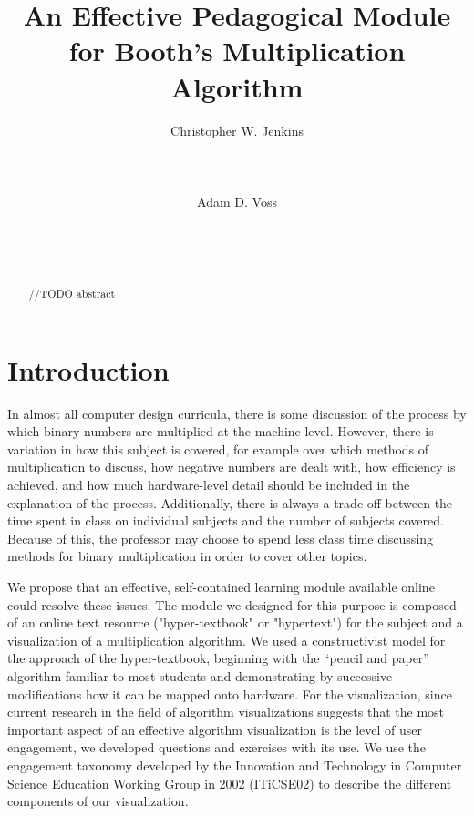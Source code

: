 \documentclass{acm_proc_article-sp}
\begin{document}
\title{An Effective Pedagogical Module for Booth's Multiplication Algorithm}

\author{
    \alignauthor
    Christopher W.
Jenkins\\
       \\
       \\
       \\
    \alignauthor
    Adam D.
Voss\\
       \\
       \\
       \\
}

\maketitle

\begin{abstract}
//TODO abstract
\end{abstract}

\section{Introduction}
In almost all computer design curricula, there is some discussion of the process by which binary numbers are multiplied at the machine level.
However, there is variation in how this subject is covered, for example over which methods of multiplication to discuss, how negative numbers are dealt with, how efficiency is achieved, and how much hardware-level detail should be included in the explanation of the process.
Additionally, there is always a trade-off between the time spent in class on individual subjects and the number of subjects covered.
Because of this, the professor may choose to spend less class time discussing methods for binary multiplication in order to cover other topics.

We propose that an effective, self-contained learning module available online could resolve these issues.
The module we designed for this purpose is composed of an online text resource ("hyper-textbook" or "hypertext") for the subject and a visualization of a multiplication algorithm.
We used a constructivist model for the approach of the hyper-textbook, beginning with the ``pencil and paper'' algorithm familiar to most students and demonstrating by successive modifications how it can be mapped onto hardware.
For the visualization, since current research in the field of algorithm visualizations suggests that the most important aspect of an effective algorithm visualization is the level of user engagement\cite{tnaps:visengage}, we developed questions and exercises with its use.
We use the engagement taxonomy developed by the Innovation and Technology in Computer Science Education Working Group in 2002 (ITiCSE02) to describe the different components of our visualization.
\end{document}
